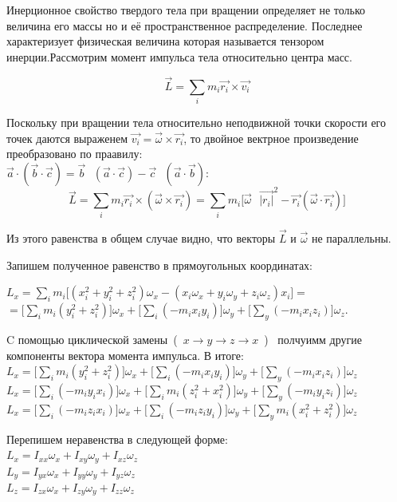 \documentclass[12pt, a4paper]{article}
\begin{document}
Инерционное свойство твердого тела при вращении определяет не только величина его массы но и её пространственное распределение. Последнее характеризует физическая величина которая называется тензором инерции.Рассмотрим момент импульса тела относительно центра масс.

\begin{equation}
	\vec{L}=\displaystyle\sum_im_i\vec{r_i}\times\vec{v_i}
\end{equation}

Поскольку при вращении тела относительно неподвижной точки скорости его точек даются выраженем $\vec{v_i} = \vec{\omega}\times \vec{r_i}$, то двойное вектрное произведение преобразовано по праавилу: \\
${\vec{a}} \cdot ({\vec{b}} \cdot {\vec{c}}) = \vec{b}\mbox{ } (\vec{a}\cdot \vec{c}) - \vec{c}\mbox{ } ({\vec{a}} \cdot {\vec{b}})$:\\
\[\vec{L}=\displaystyle\sum_i m_i\vec{r_i}\times(\vec{\omega}\times \vec{r_i}) = \sum_i m_i \big[ \vec{\omega}\mbox{ } \vec{|r_i|}^2 - \vec{r_i} (\vec{\omega}\cdot \vec{r_i})\big]\]

	Из этого равенства в общем случае видно, что векторы $\vec{L}$ и $\vec{\omega}$ не параллельны.
	
	Запишем полученное равенство в прямоугольных координатах:
	

	$L_x = \displaystyle \sum_i m_i\big[(x_i^2+y_i^2+z_i^2)\omega_x - (x_i\omega_x+y_i\omega_y+z_i\omega_z)x_i\big] =$ \\
	$= \Big[ \sum_i m_i (y_i^2+z_i^2)\Big]\omega_x + \Big[ \sum_i(-m_ix_iy_i) \Big]\omega_y + \Big[\sum_y(-m_ix_iz_i)\Big]\omega_z.$
	

	
	C помощью циклической замены~(~$x\rightarrow y\rightarrow z \rightarrow x$~)~ полчуимм другие компоненты вектора момента импульса. В итоге:\\
$L_x = \Big[ \sum_i m_i (y_i^2+z_i^2)\Big]\omega_x + \Big[ \sum_i(-m_ix_iy_i) \Big]\omega_y + \Big[\sum_y(-m_ix_iz_i)\Big]\omega_z $\\
$L_x = \Big[ \sum_i (-m_i y_i x_i)\Big]\omega_x + \Big[ \sum_im_i( z_i^2+x_i^2 ) \Big]\omega_y + \Big[\sum_y(-m_iy_iz_i)\Big]\omega_z $\\
$L_x = \Big[ \sum_i (-m_i z_ix_i)\Big]\omega_x + \Big[ \sum_i(-m_iz_iy_i) \Big]\omega_y + \Big[\sum_y m_i (x_i^2+z_i^2)\Big]\omega_z $


	Перепишем неравенства в следующей форме:\\
$L_x = I_{xx}\omega_x+I_{xy}\omega_y+I_{xz}\omega_z$\\
$L_y = I_{yx}\omega_x+I_{yy}\omega_y+I_{yz}\omega_z$\\
$L_z = I_{zx}\omega_x+I_{zy}\omega_y+I_{zz}\omega_z$
\end{document}

